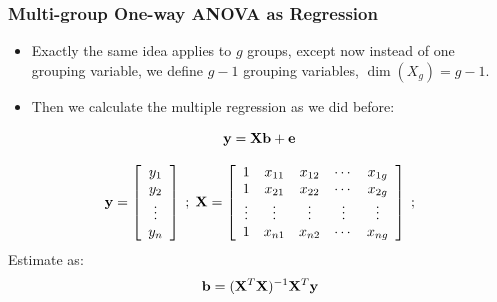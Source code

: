 \documentclass{beamer}
\begin{document}
\begin{frame}
  \frametitle{Multi-group One-way ANOVA as Regression}

\begin{itemize}

\item Exactly the same idea applies to $g$ groups, except now instead of one grouping variable, we define $g-1$ grouping variables, $\dim(X_g) = g-1$.

\item Then we calculate the multiple regression as we did before:

\end{itemize}

$$
\mathbf{y} = \mathbf{X}\mathbf{b} + \mathbf{e}
$$

$$
\mathbf{y} = \left[ \begin{array}{c}
y_1 \\ y_2 \\ \vdots \\y_n \\
\end{array}
\right]
\;
;
\;
\mathbf{X} = \left[ \begin{array}{ccccc}
1 & x_{11} & x_{12} & \cdots & x_{1g} \\
1 & x_{21} & x_{22} & \cdots & x_{2g} \\
\vdots & \vdots & \vdots & \vdots & \vdots \\
1 & x_{n1} & x_{n2} & \cdots & x_{ng} \\
\end{array}
\right]
\;
;
$$
%
Estimate  as:
$$
\mathbf{b} = (\mathbf{X}^T \mathbf{X})^{-1}\mathbf{X}^T\mathbf{y}
$$

\end{frame}
\end{document}
